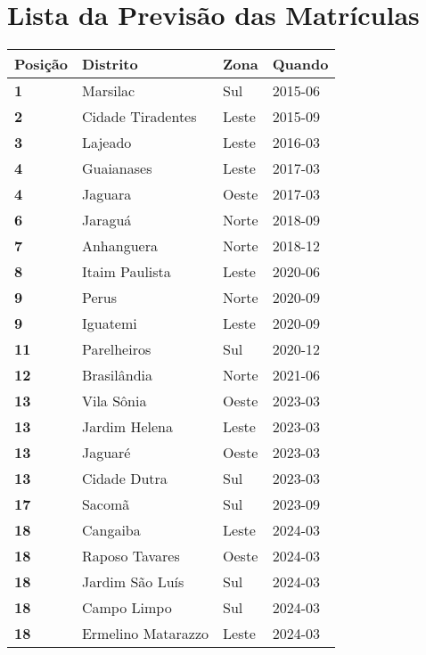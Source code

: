 \newpage

\section{Lista da Previsão das Matrículas}

\begin{table}[H]
	\centering
	\begin{tabular}{l|l|l|l}
		\textbf{Posição} & \textbf{Distrito} & \textbf{Zona} & \textbf{Quando} \\ \hline
		\textbf{1} & Marsilac & Sul & 2015-06\\ \hline
		\textbf{2} & Cidade Tiradentes & Leste & 2015-09\\ \hline
		\textbf{3} & Lajeado & Leste & 2016-03\\ \hline
		\textbf{4} & Guaianases & Leste & 2017-03\\ \hline
		\textbf{4} & Jaguara & Oeste & 2017-03\\ \hline
		\textbf{6} & Jaraguá & Norte & 2018-09\\ \hline
		\textbf{7} & Anhanguera & Norte & 2018-12\\ \hline
		\textbf{8} & Itaim Paulista & Leste & 2020-06\\ \hline
		\textbf{9} & Perus & Norte & 2020-09\\ \hline
		\textbf{9} & Iguatemi & Leste & 2020-09\\ \hline
		\textbf{11} & Parelheiros & Sul & 2020-12\\ \hline
		\textbf{12} & Brasilândia & Norte & 2021-06\\ \hline
		\textbf{13} & Vila Sônia & Oeste & 2023-03\\ \hline
		\textbf{13} & Jardim Helena & Leste & 2023-03\\ \hline
		\textbf{13} & Jaguaré & Oeste & 2023-03\\ \hline
		\textbf{13} & Cidade Dutra & Sul & 2023-03\\ \hline
		\textbf{17} & Sacomã & Sul & 2023-09\\ \hline
		\textbf{18} & Cangaiba & Leste & 2024-03\\ \hline
		\textbf{18} & Raposo Tavares & Oeste & 2024-03\\ \hline
		\textbf{18} & Jardim São Luís & Sul & 2024-03\\ \hline
		\textbf{18} & Campo Limpo & Sul & 2024-03\\ \hline
		\textbf{18} & Ermelino Matarazzo & Leste & 2024-03\\ \hline

\end{tabular}
\end{table}
